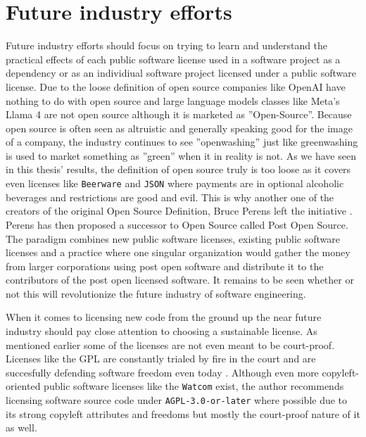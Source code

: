 \section{Future industry efforts}
Future industry efforts should focus on trying to learn and understand the practical effects of each public software license used in a software project as a dependency or as an individiual software project licensed under a public software license. Due to the loose definition of open source companies like OpenAI have nothing to do with open source and large language models classes like Meta's Llama 4 are not open source although it is marketed as ''Open-Source''. Because open source is often seen as altruistic and generally speaking good for the image of a company, the industry continues to see ''openwashing'' just like greenwashing is used to market something as ''green'' when it in reality is not. As we have seen in this thesis' results, the definition of open source truly is too loose as it covers even licenses like \texttt{Beerware} and \texttt{JSON} where payments are in optional alcoholic beverages and restrictions are good and evil. This is why another one of the creators of the original Open Source Definition, Bruce Perens left the initiative \citep{register:perens-left-osi}.  Perens has then proposed a successor to Open Source called Post Open Source. The paradigm combines new public software licenses, existing public software licenses and a practice where one singular organization would gather the money from larger corporations using post open software and distribute it to the contributors of the post open licensed software. It remains to be seen whether or not this will revolutionize the future industry of software engineering. 

When it comes to licensing new code from the ground up the near future industry should pay close attention to choosing a sustainable license. As mentioned earlier some of the licenses are not even meant to be court-proof. Licenses like the GPL are constantly trialed by fire in the court and are succesfully defending software freedom even today \citep{gplv2-court}. Although even more copyleft-oriented public software licenses like the \texttt{Watcom} exist, the author recommends licensing software source code under \texttt{AGPL-3.0-or-later} where possible due to its strong copyleft attributes and freedoms but mostly the court-proof nature of it as well.

